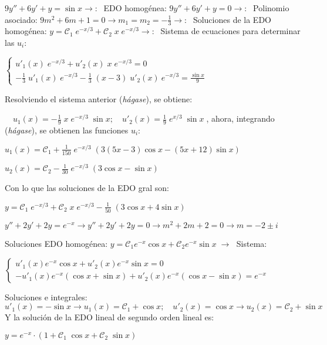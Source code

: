 \begin{ejem}
$9y''+6y'+y=\sin x \to : \; $ EDO homogénea: $9y''+6y'+y=0 \to :\; $  Polinomio asociado: $9m^2+6m+1=0 \to m_1=m_2=-\frac 1 3 \to : \; $ Soluciones de la EDO homogénea: $y=\mathcal{C}_1 \; e^{-x/3} + \mathcal{C}_2 \; x \; e^{-x/3} \to :\; $	Sistema de ecuaciones para determinar las $u_i$:

$\begin{cases}
u'_1(x)\; e^{-x/3} + u'_2(x) \; x \; e^{-x/3} = 0 \\
-\frac 1 3 \; u'_1(x)\; e^{-x/3} - \frac 1 3 \; (x-3)\;  u'_2(x)\ e^{-x/3} = \frac {\sin x}{9} 	
\end{cases}$

Resolviendo el sistema anterior (\emph{hágase}), se obtiene:

$\quad u_1(x)=-\frac 1 9 \; x \; e^{-x/3}\; \sin x ; \quad  u'_2(x)= \frac 1 9 \; e^{x/3} \; \sin x\; $, ahora, integrando (\emph{hágase}), se obtienen las funciones $u_i$:

$u_1(x)=\mathcal{C}_1+\frac 1 {150}\;  e^{-x/3} \; \left( 3(5x-3)\cos x -(5x+12)\sin x \right)\;$

$u_2(x)=\mathcal{C}_2 - \frac 1 {30} \; e^{-x/3}\; (3\cos x-\sin x)$

Con lo que las soluciones de la EDO gral son:

\hspace{30mm} $y=\mathcal{C}_1 \; e^{-x/3}+\mathcal{C}_2 \; x \; e^{-x/3}- \frac 1 {50} \; (3\cos x + 4 \sin x)$

\end{ejem}


\begin{ejem}
	$y''+2y'+2y=e^{-x} \to y''+2y'+2y=0 \to m^2+2m+2=0 \to m=-2 \pm i$

Soluciones EDO homogénea: $y=\mathcal{C}_1 e^{-x} \cos x + \mathcal{C}_2 e^{-x} \sin x \; \to \; $ Sistema:

$\begin{cases}
u'_1(x)e^{-x} \cos x + u'_2(x) e^{-x} \sin x = 0 \\
-u'_1(x) e^{-x} (\cos x + \sin x ) + u'_2(x) e^{-x} (\cos x - \sin x )=e^{-x}	
\end{cases}$

Soluciones e integrales: $u'_1(x)=-\sin x \to u_1(x)=\mathcal{C}_1 + \cos x ; \quad u'_2(x)=\cos x \to u_2(x)=\mathcal{C}_2 +\sin x$ Y la solución de la EDO lineal de segundo orden lineal es:

\hspace{30mm} $y=e^{-x}\cdot \left( 1+ \mathcal{C}_1 \; \cos x + \mathcal{C}_2 \; \sin x \right)$ 


\end{ejem}

